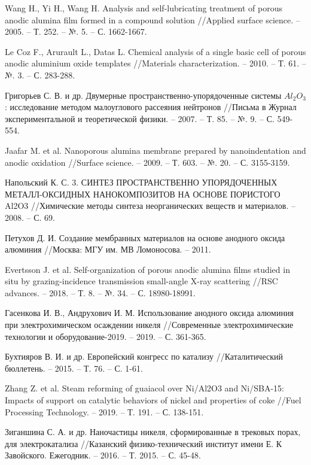 \begin{thebibliography}{00}
Wang H., Yi H., Wang H. Analysis and self-lubricating treatment of porous anodic alumina film formed in a compound solution //Applied surface science. – 2005. – Т. 252. – №. 5. – С. 1662-1667.

Le Coz F., Arurault L., Datas L. Chemical analysis of a single basic cell of porous anodic aluminium oxide templates //Materials characterization. – 2010. – Т. 61. – №. 3. – С. 283-288.

Григорьев С. В. и др. Двумерные пространственно-упорядоченные системы $Al _2 O _3$: исследование методом малоуглового рассеяния нейтронов //Письма в Журнал экспериментальной и теоретической физики. – 2007. – Т. 85. – №. 9. – С. 549-554.

Jaafar M. et al. Nanoporous alumina membrane prepared by nanoindentation and anodic oxidation //Surface science. – 2009. – Т. 603. – №. 20. – С. 3155-3159.

Напольский К. С. 3. СИНТЕЗ ПРОСТРАНСТВЕННО УПОРЯДОЧЕННЫХ МЕТАЛЛ-ОКСИДНЫХ НАНОКОМПОЗИТОВ НА ОСНОВЕ ПОРИСТОГО Al2O3 //Химические методы синтеза неорганических веществ и материалов. – 2008. – С. 69.

Петухов Д. И. Создание мембранных материалов на основе анодного оксида алюминия //Москва: МГУ им. МВ Ломоносова. – 2011.

Evertsson J. et al. Self-organization of porous anodic alumina films studied in situ by grazing-incidence transmission small-angle X-ray scattering //RSC advances. – 2018. – Т. 8. – №. 34. – С. 18980-18991.

Гасенкова И. В., Андрухович И. М. Использование анодного оксида алюминия при электрохимическом осаждении никеля //Современные электрохимические технологии и оборудование-2019. – 2019. – С. 361-365.

Бухтияров В. И. и др. Европейский конгресс по катализу //Каталитический бюллетень. – 2015. – Т. 76. – С. 1-61.

Zhang Z. et al. Steam reforming of guaiacol over Ni/Al2O3 and Ni/SBA-15: Impacts of support on catalytic behaviors of nickel and properties of coke //Fuel Processing Technology. – 2019. – Т. 191. – С. 138-151.

Зиганшина С. А. и др. Наночастицы никеля, сформированные в трековых порах, для электрокатализа //Казанский физико-технический институт имени Е. К Завойского. Ежегодник. – 2016. – Т. 2015. – С. 45-48.


\end{thebibliography}
